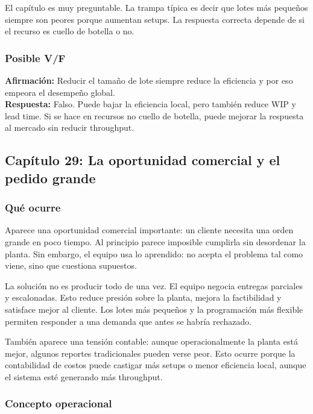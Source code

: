 \documentclass[
  11pt,
]{article}
\begin{document}
El capítulo es muy preguntable. La trampa típica es decir que lotes más
pequeños siempre son peores porque aumentan setups. La respuesta
correcta depende de si el recurso es cuello de botella o no.

\hypertarget{posible-vf-1}{%
\subsubsection{Posible V/F}\label{posible-vf-1}}

\textbf{Afirmación:} Reducir el tamaño de lote siempre reduce la
eficiencia y por eso empeora el desempeño global.\\
\textbf{Respuesta:} Falso. Puede bajar la eficiencia local, pero también
reduce WIP y lead time. Si se hace en recursos no cuello de botella,
puede mejorar la respuesta al mercado sin reducir throughput.

\hypertarget{capuxedtulo-29-la-oportunidad-comercial-y-el-pedido-grande}{%
\subsection{Capítulo 29: La oportunidad comercial y el pedido
grande}\label{capuxedtulo-29-la-oportunidad-comercial-y-el-pedido-grande}}

\hypertarget{quuxe9-ocurre-2}{%
\subsubsection{Qué ocurre}\label{quuxe9-ocurre-2}}

Aparece una oportunidad comercial importante: un cliente necesita una
orden grande en poco tiempo. Al principio parece imposible cumplirla sin
desordenar la planta. Sin embargo, el equipo usa lo aprendido: no acepta
el problema tal como viene, sino que cuestiona supuestos.

La solución no es producir todo de una vez. El equipo negocia entregas
parciales y escalonadas. Esto reduce presión sobre la planta, mejora la
factibilidad y satisface mejor al cliente. Los lotes más pequeños y la
programación más flexible permiten responder a una demanda que antes se
habría rechazado.

También aparece una tensión contable: aunque operacionalmente la planta
está mejor, algunos reportes tradicionales pueden verse peor. Esto
ocurre porque la contabilidad de costos puede castigar más setups o
menor eficiencia local, aunque el sistema esté generando más throughput.

\hypertarget{concepto-operacional-2}{%
\subsubsection{Concepto operacional}\label{concepto-operacional-2}}
\end{document}
